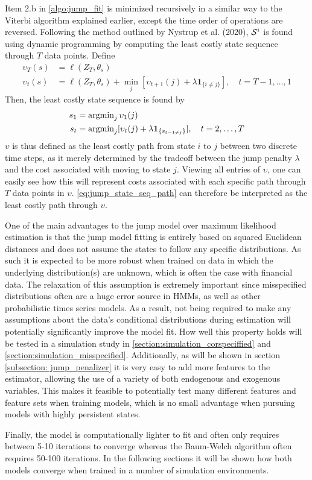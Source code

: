 Item 2.b in \cref{algo:jump_fit} is minimized recursively in a similar way to the Viterbi algorithm explained earlier, except the time order of operations are reversed. Following the method outlined by Nystrup et al. (2020), $\S^i$ is found using dynamic programming by computing the least costly state sequence through $T$ data points. Define
\begin{align}
    \upsilon_T(s) &= \ell(Z_T, \theta_s) \\
    \upsilon_t(s) &= \ell(Z_T, \theta_s) + \min_j[\upsilon_{t+1}(j) + \lambda\mathbf{1}_{\{ i\ne j \}}],
    \quad t=T-1,\ldots,1
\label{eq:jump_cost_path}
\end{align}
Then, the least costly state sequence is found by
\begin{align}
    s_1 &= \argmin_j \upsilon_1(j) \\
    s_t &= \argmin_j[\upsilon_t(j) + \lambda\mathbf{1}_{\{ s_{t-1 \ne j} \}}], \quad t=2,\ldots,T
    \label{eq:jump_state_seq_path}
\end{align}
$\upsilon$ is thus defined as the least costly path from state $i$ to $j$ between two discrete time steps, as it merely determined by the tradeoff between the jump penalty $\lambda$ and the cost associated with moving to state $j$. Viewing all entries of $\upsilon$, one can easily see how this will represent costs associated with each specific path through $T$ data points in $\upsilon$. \cref{eq:jump_state_seq_path} can therefore be interpreted as the least costly path through $\upsilon$. 

One of the main advantages to the jump model over maximum likelihood estimation is that the jump model fitting is entirely based on squared Euclidean distances and does not assume the states to follow any specific distributions. As such it is expected to be more robust when trained on data in which the underlying distribution(s) are unknown, which is often the case with financial data. The relaxation of this assumption is extremely important since misspecified distributions often are a huge error source in HMMs, as well as other probabilistic times series models. As a result, not being required to make any assumptions about the data's conditional distributions during estimation will potentially significantly improve the model fit. How well this property holds will be tested in a simulation study in \cref{section:simulation_corspeciffied} and \cref{section:simulation_misspecified}. Additionally, as will be shown in section \ref{subsection: jump_penalizer} it is very easy to add more features to the estimator, allowing the use of a variety of both endogenous and exogenous variables. This makes it feasible to potentially test many different features and feature sets when training models, which is no small advantage when pursuing models with highly persistent states.

Finally, the model is computationally lighter to fit and often only requires between 5-10 iterations to converge whereas the Baum-Welch algorithm often requires 50-100 iterations. In the following sections it will be shown how both models converge when trained in a number of simulation environments. 

